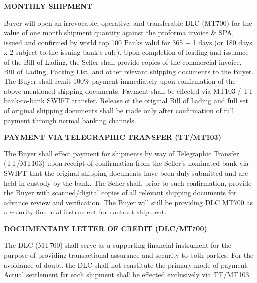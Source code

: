 \documentclass[a4paper,11pt]{article}
\begin{document}
\vspace{0.3cm}
\begin{center}{\large\textbf{\color{marooncolor}MONTHLY SHIPMENT}}\end{center}
\vspace{0.1cm}
\noindent Buyer will open an irrevocable, operative, and transferable DLC (MT700) for the value of one month shipment quantity against the proforma invoice \& SPA, issued and confirmed by world top 100 Banks valid for 365 + 1 days (or 180 days x 2 subject to the issuing bank's rule). Upon completion of loading and issuance of the Bill of Lading, the Seller shall provide copies of the commercial invoice, Bill of Lading, Packing List, and other relevant shipping documents to the Buyer. The Buyer shall remit 100\% payment immediately upon confirmation of the above mentioned shipping documents. Payment shall be effected via MT103 / TT bank-to-bank SWIFT transfer. Release of the original Bill of Lading and full set of original shipping documents shall be made only after confirmation of full payment through normal banking channels.

\vspace{0.3cm}
\begin{center}{\large\textbf{\color{marooncolor}PAYMENT VIA TELEGRAPHIC TRANSFER (TT/MT103)}}\end{center}
\vspace{0.1cm}
\noindent The Buyer shall effect payment for shipments by way of Telegraphic Transfer (TT/MT103) upon receipt of confirmation from the Seller's nominated bank via SWIFT that the original shipping documents have been duly submitted and are held in custody by the bank. The Seller shall, prior to such confirmation, provide the Buyer with scanned/digital copies of all relevant shipping documents for advance review and verification. The Buyer will still be providing DLC MT700 as a security financial instrument for contract shipment.

\vspace{0.3cm}
\begin{center}{\large\textbf{\color{marooncolor}DOCUMENTARY LETTER OF CREDIT (DLC/MT700)}}\end{center}
\vspace{0.1cm}
\noindent The DLC (MT700) shall serve as a supporting financial instrument for the purpose of providing transactional assurance and security to both parties. For the avoidance of doubt, the DLC shall not constitute the primary mode of payment. Actual settlement for each shipment shall be effected exclusively via TT/MT103.
\end{document}
